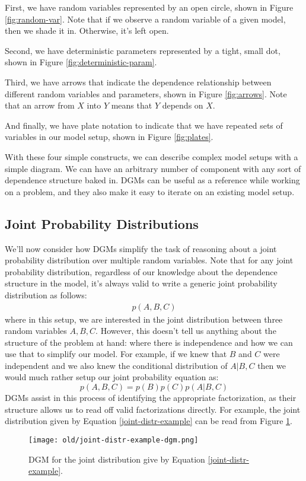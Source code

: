 First, we have random variables represented by an open circle, shown in Figure \ref{fig:random-var}. Note that if we observe a random variable of a given model, then we shade it in. Otherwise, it's left open.

Second, we have deterministic parameters represented by a tight, small dot, shown in Figure \ref{fig:deterministic-param}.

Third, we have arrows that indicate the dependence relationship between different random variables and parameters, shown in Figure \ref{fig:arrows}. Note that an arrow from $X$ into $Y$ means that $Y$ depends on $X$.

And finally, we have plate notation to indicate that we have repeated sets of variables in our model setup, shown in Figure \ref{fig:plates}.

With these four simple constructs, we can describe complex model setups with a simple diagram. We can have an arbitrary number of component with any sort of dependence structure baked in. DGMs can be useful as a reference while working on a problem, and they also make it easy to iterate on an existing model setup.

\subsection{Joint Probability Distributions}
We'll now consider how DGMs simplify the task of reasoning about a joint probability distribution over multiple random variables. Note that for any joint probability distribution, regardless of our knowledge about the dependence structure in the model, it's always valid to write a generic joint probability distribution as follows:
\begin{align*}
	p(A, B, C)
\end{align*}
where in this setup, we are interested in the joint distribution between three random variables $A, B, C$. However, this doesn't tell us anything about the structure of the problem at hand: where there is independence and how we can use that to simplify our model. For example, if we knew that $B$ and $C$ were independent and we also knew the conditional distribution of $A | B, C$ then we would much rather setup our joint probability equation as:
\begin{equation} \label{joint-distr-example}
	p(A, B, C) = p(B)p(C)p(A | B, C)
\end{equation}
DGMs assist in this process of identifying the appropriate factorization, as their structure allows us to read off valid factorizations directly. For example, the joint distribution given by Equation \ref{joint-distr-example} can be read from Figure \ref{fig:joint-distr-example-dgm}.
\begin{figure}
    \centering
    \texttt{[image: old/joint-distr-example-dgm.png]}
    \caption{DGM for the joint distribution give by Equation \ref{joint-distr-example}.}
    \label{fig:joint-distr-example-dgm}
\end{figure}

